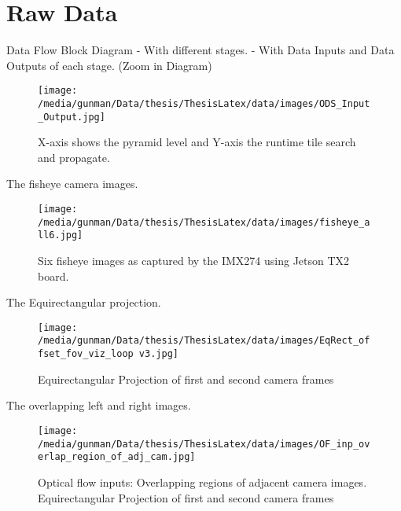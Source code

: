 \chapter{Raw Data}


Data Flow \newline
Block Diagram
- With different stages.
- With Data Inputs and Data Outputs of each stage. (Zoom in Diagram)

\begin{figure*}
	\begin{center}
		\texttt{[image: /media/gunman/Data/thesis/ThesisLatex/data/images/ODS\_Input\_Output.jpg]}
		\caption{X-axis shows the pyramid level and Y-axis the runtime tile search and propagate.}
		\label{ODS_Input_Output}
	\end{center}
	\vspace{-0.3in}
\end{figure*} 

The fisheye camera images.

\begin{figure*}
	\begin{center}
		\texttt{[image: /media/gunman/Data/thesis/ThesisLatex/data/images/fisheye\_all6.jpg]}
		\caption{Six fisheye images as captured by the IMX274 using Jetson TX2 board.}
		\label{ODS_Input_Output}
	\end{center}
	\vspace{-0.3in}
\end{figure*} 

The Equirectangular projection.

\begin{figure*}
	\begin{center}
		\texttt{[image: /media/gunman/Data/thesis/ThesisLatex/data/images/EqRect\_offset\_fov\_viz\_loop v3.jpg]}
		\caption{Equirectangular Projection of first and second camera frames}
		\label{ODS_Input_Ouput}
	\end{center}
	\vspace{-0.3in}
\end{figure*} 

The overlapping left and right images.
\begin{figure*}
	\begin{center}
		\texttt{[image: /media/gunman/Data/thesis/ThesisLatex/data/images/OF\_inp\_overlap\_region\_of\_adj\_cam.jpg]}
		\caption{Optical flow inputs: Overlapping regions of adjacent camera images. Equirectangular Projection of first and second camera frames}
		\label{ODS_Input_Ouput}
	\end{center}
	\vspace{-0.3in}
\end{figure*} 


